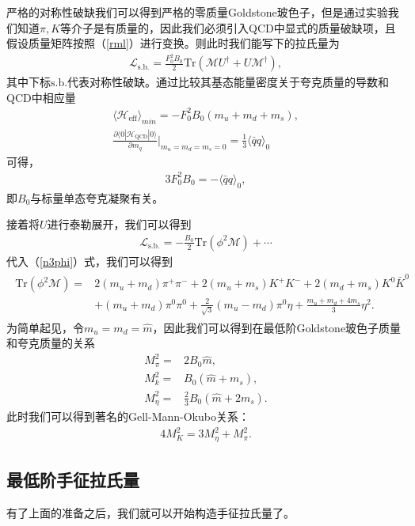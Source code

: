 \documentclass[aps,tightenlines,16pt]{ctexart}
\numberwithin{equation}{section}
\newcommand{\mL}{\mathcal{L}}
\begin{document}
严格的对称性破缺我们可以得到严格的零质量Goldstone玻色子，但是通过实验我们知道$\pi,K$等介子是有质量的，因此我们必须引入QCD中显式的质量破缺项，且假设质量矩阵按照（\ref{rml}）进行变换。则此时我们能写下的拉氏量为
\begin{align}
   \mL_{\text{s.b.}}=\frac{F_0^2B_0}{2}\text{Tr}(\mathcal{M}U^{\dagger}+U\mathcal{M^{\dagger}}),
\end{align}
其中下标$\text{s.b.}$代表对称性破缺。通过比较其基态能量密度关于夸克质量的导数和QCD中相应量
\begin{align}
   \langle \mathcal{H}_{\text{eff}}\rangle_{min}=-F_0^2B_0(m_u+m_d+m_s),\\
   \frac{\partial\langle 0|\mathcal{H}_{\text{QCD}}|0\rangle}{\partial m_q}\Big|_{m_u=m_d=m_s=0}=\frac{1}{3}\langle\bar{q}q\rangle_0
\end{align}
可得，
\begin{align}
   3F_0^2B_0=-\langle\bar{q}q\rangle_0,
\end{align}
即$B_0$与标量单态夸克凝聚有关。

接着将$U$进行泰勒展开，我们可以得到
\begin{align}
   \mathcal{L}_{\text{s.b.}} = -\frac{B_0}{2}\text{Tr}(\phi^2\mathcal{M})+\cdots
\end{align}
代入（\ref{n3phi}）式，我们可以得到
\begin{align}
   \begin{aligned}
   \text{Tr}(\phi^2\mathcal{M})=&2(m_u+m_d)\pi^{+}\pi^{-}+2(m_u+m_s)K^{+}K^{-}+2(m_d+m_s)K^0\bar{K}^0\\
   &+(m_u+m_d)\pi^0\pi^0+\frac{2}{\sqrt{3}}(m_u-m_d)\pi^0\eta+\frac{m_u+m_d+4m_s}{3}\eta^2.
   \end{aligned}
\end{align}
为简单起见，令$m_u=m_d=\hat{m}$，因此我们可以得到在最低阶Goldstone玻色子质量和夸克质量的关系
\begin{align}
   M_{\pi}^2=&2B_0\hat{m},\\
   M_k^2=&B_0(\hat{m}+m_s),\\
   M_{\eta}^2=&\frac{2}{3}B_0(\hat{m}+2m_s).
\end{align}
此时我们可以得到著名的Gell-Mann-Okubo关系：
\begin{align}
   4M_K^2=3M_{\eta}^2+M_{\pi}^2.
\end{align}







\subsection{最低阶手征拉氏量}
有了上面的准备之后，我们就可以开始构造手征拉氏量了。
\end{document}
